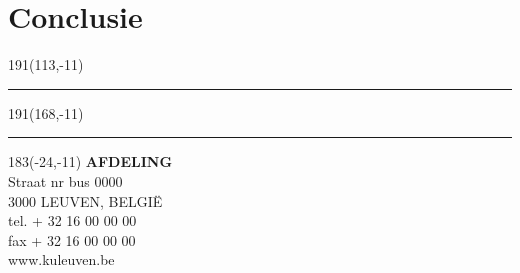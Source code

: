 \documentclass[12pt,a4paper,oneside]{book}
\begin{document}
\chapter{Conclusie} \label{chap:conclusie}


\newpage




\newpage

\thispagestyle{empty}
\sffamily
%
\begin{textblock}{191}(113,-11)
{\color{blueline}\rule{160pt}{5.5pt}}
\end{textblock}
%
\begin{textblock}{191}(168,-11)
{\color{blueline}\rule{5.5pt}{59pt}}
\end{textblock}
%
\begin{textblock}{183}(-24,-11)
\textblockcolour{}
\flushright
\fontsize{7}{7.5}\selectfont
\textbf{AFDELING}\\
Straat nr bus 0000\\
3000 LEUVEN, BELGI\"{E}\\
tel. + 32 16 00 00 00\\
fax + 32 16 00 00 00\\
www.kuleuven.be\\
\end{textblock}
%
\end{document}
